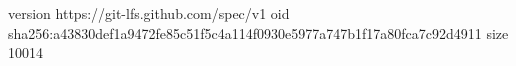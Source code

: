 version https://git-lfs.github.com/spec/v1
oid sha256:a43830def1a9472fe85c51f5c4a114f0930e5977a747b1f17a80fca7c92d4911
size 10014
